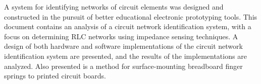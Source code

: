 % 
% 
%


A system for identifying networks of circuit elements was designed and constructed in the pursuit of better educational electronic prototyping tools.
This document contains an analysis of a circuit network identification system, with a focus on determining RLC networks using impedance sensing techniques.  
A design of both hardware and software implementations of the circuit network identification system are presented, and the results of the implementations are analyzed.
Also presented is a method for surface-mounting breadboard finger springs to printed circuit boards.



